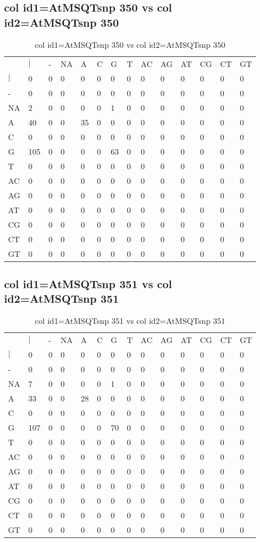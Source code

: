 \subsection{col id1=AtMSQTsnp 350 vs col id2=AtMSQTsnp 350}
\begin{center}
\begin{longtable}{|l|l|l|l|l|l|l|l|l|l|l|l|l|l|}
\caption{col id1=AtMSQTsnp 350 vs col id2=AtMSQTsnp 350} \label{table_dm678}\\
\hline
\\
\hline
&$|$&-&NA&A&C&G&T&AC&AG&AT&CG&CT&GT\\
$|$&0&0&0&0&0&0&0&0&0&0&0&0&0\\
-&0&0&0&0&0&0&0&0&0&0&0&0&0\\
NA&2&0&0&0&0&1&0&0&0&0&0&0&0\\
A&40&0&0&35&0&0&0&0&0&0&0&0&0\\
C&0&0&0&0&0&0&0&0&0&0&0&0&0\\
G&105&0&0&0&0&63&0&0&0&0&0&0&0\\
T&0&0&0&0&0&0&0&0&0&0&0&0&0\\
AC&0&0&0&0&0&0&0&0&0&0&0&0&0\\
AG&0&0&0&0&0&0&0&0&0&0&0&0&0\\
AT&0&0&0&0&0&0&0&0&0&0&0&0&0\\
CG&0&0&0&0&0&0&0&0&0&0&0&0&0\\
CT&0&0&0&0&0&0&0&0&0&0&0&0&0\\
GT&0&0&0&0&0&0&0&0&0&0&0&0&0\\
\hline
\end{longtable}
\end{center}

\subsection{col id1=AtMSQTsnp 351 vs col id2=AtMSQTsnp 351}
\begin{center}
\begin{longtable}{|l|l|l|l|l|l|l|l|l|l|l|l|l|l|}
\caption{col id1=AtMSQTsnp 351 vs col id2=AtMSQTsnp 351} \label{table_dm680}\\
\hline
\\
\hline
&$|$&-&NA&A&C&G&T&AC&AG&AT&CG&CT&GT\\
$|$&0&0&0&0&0&0&0&0&0&0&0&0&0\\
-&0&0&0&0&0&0&0&0&0&0&0&0&0\\
NA&7&0&0&0&0&1&0&0&0&0&0&0&0\\
A&33&0&0&28&0&0&0&0&0&0&0&0&0\\
C&0&0&0&0&0&0&0&0&0&0&0&0&0\\
G&107&0&0&0&0&70&0&0&0&0&0&0&0\\
T&0&0&0&0&0&0&0&0&0&0&0&0&0\\
AC&0&0&0&0&0&0&0&0&0&0&0&0&0\\
AG&0&0&0&0&0&0&0&0&0&0&0&0&0\\
AT&0&0&0&0&0&0&0&0&0&0&0&0&0\\
CG&0&0&0&0&0&0&0&0&0&0&0&0&0\\
CT&0&0&0&0&0&0&0&0&0&0&0&0&0\\
GT&0&0&0&0&0&0&0&0&0&0&0&0&0\\
\hline
\end{longtable}
\end{center}

